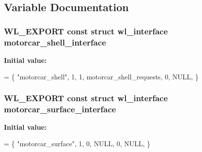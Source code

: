 \subsection{Variable Documentation}
\hypertarget{clients_2simple-egl_2motorcar-wayland-extensions_8c_af93f16d847b10210463edbe6017b9517}{
\subsubsection[{motorcar\-\_\-shell\-\_\-interface}]{\setlength{\rightskip}{0pt plus 5cm}W\-L\-\_\-\-E\-X\-P\-O\-R\-T const struct wl\-\_\-interface {\bf motorcar\-\_\-shell\-\_\-interface}}}\label{clients_2simple-egl_2motorcar-wayland-extensions_8c_af93f16d847b10210463edbe6017b9517}
{\bfseries Initial value\-:}
\begin{DoxyCode}
= \{
    \textcolor{stringliteral}{"motorcar\_shell"}, 1,
    1, motorcar\_shell\_requests,
    0, NULL,
\}
\end{DoxyCode}
\hypertarget{clients_2simple-egl_2motorcar-wayland-extensions_8c_a56acb8594d0103b3705453e8ea77915b}{
\subsubsection[{motorcar\-\_\-surface\-\_\-interface}]{\setlength{\rightskip}{0pt plus 5cm}W\-L\-\_\-\-E\-X\-P\-O\-R\-T const struct wl\-\_\-interface motorcar\-\_\-surface\-\_\-interface}}\label{clients_2simple-egl_2motorcar-wayland-extensions_8c_a56acb8594d0103b3705453e8ea77915b}
{\bfseries Initial value\-:}
\begin{DoxyCode}
= \{
    \textcolor{stringliteral}{"motorcar\_surface"}, 1,
    0, NULL,
    0, NULL,
\}
\end{DoxyCode}

